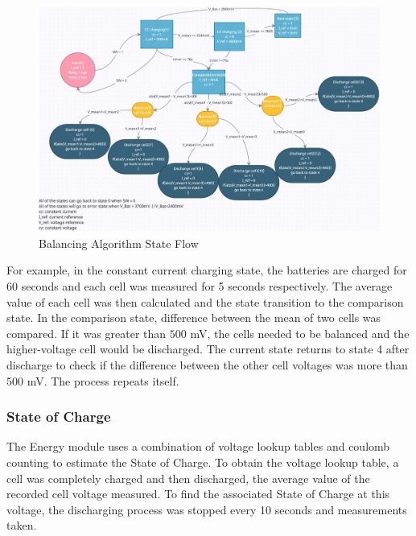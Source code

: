 \documentclass[11pt, a4paper]{article}
\begin{document}
\begin{figure} [h!]
    \centering
    \includegraphics[scale=0.65]{Energy_state.JPG}
    \caption{Balancing Algorithm State Flow}
    \label{fig:State}
\end{figure}

For example, in the constant current charging state, the batteries are charged for 60 seconds and each cell was measured for 5 seconds respectively. The average value of each cell was then calculated and the state transition to the comparison state. In the comparison state, difference between the mean of two cells was compared. If it was greater than $500$ mV, the cells needed to be balanced and the higher-voltage cell would be discharged. The current state returns to state 4 after discharge to check if the difference between the other cell voltages was more than $500$ mV. The process repeats itself.

\pagebreak
\subsubsection{State of Charge}

The Energy module uses a combination of voltage lookup tables and coulomb counting to estimate the State of Charge. To obtain the voltage lookup table, a cell was completely charged and then discharged, the average value of the recorded cell voltage measured. To find the associated State of Charge at this voltage, the discharging process was stopped every 10 seconds and measurements taken.
\end{document}

